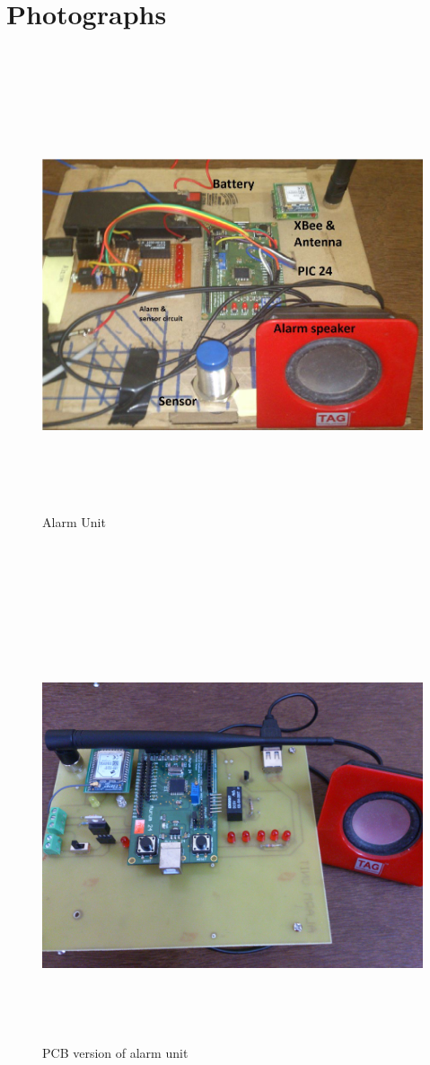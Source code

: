 \documentclass[aps,letterpaper,11pt]{article}
\begin{document}
\section{Photographs}
\mbox{}
\\
\begin{figure}[H]
\begin{center}
\includegraphics[height = 5in,width=7in,angle=00]{figures/alarmUnit.JPG}
\caption{\small Alarm Unit}
\end{center}
\end{figure}
\newpage
\mbox{}
\\ \\ \\
\begin{figure}[H]
\begin{center}
\includegraphics[height = 5in,width=7in,angle=00]{figures/alarmPCB.jpg}
\caption{\small PCB version of alarm unit}
\end{center}
\end{figure}
\end{document}
